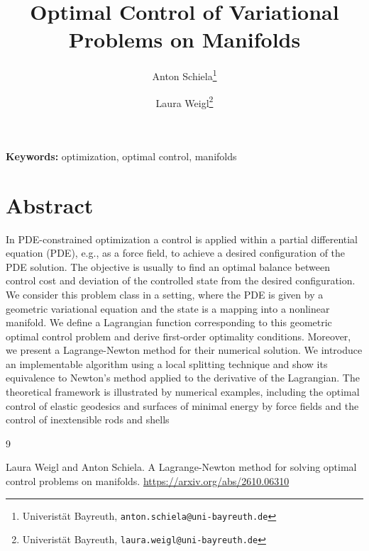 \documentclass[11pt]{article}
\title{\bfseries Optimal Control of Variational Problems on Manifolds}
\author{
Anton Schiela\thanks{Univeristät Bayreuth,
\texttt{anton.schiela@uni-bayreuth.de}}
\and
Laura Weigl\thanks{Univeristät Bayreuth,
\texttt{laura.weigl@uni-bayreuth.de}}
}
\date{}
\begin{document}
\maketitle

\vspace{-1em}

\noindent
\textbf{Keywords:}
optimization, optimal control, manifolds 

\vspace{0.5em}


\vspace{1em}

\section*{Abstract}

In PDE-constrained optimization a control is applied within a partial differential equation (PDE), e.g., as a force field, to achieve a desired configuration of the PDE solution. The objective is usually to find an optimal balance between control cost and deviation of the controlled state from the desired configuration.
We consider this problem class in a setting, where the PDE is given by a geometric variational equation and the state is a mapping into a nonlinear manifold. We define a Lagrangian function corresponding to this geometric optimal control problem and derive first-order optimality conditions. Moreover, we present a Lagrange-Newton method for their numerical solution. We introduce an implementable algorithm using a local splitting technique and show its equivalence to Newton's method applied to the derivative of the Lagrangian. The theoretical framework is illustrated by numerical examples, including the optimal control of elastic geodesics and surfaces of minimal energy by force fields and the control of inextensible rods and shells



\vspace{1em}

\begin{thebibliography}{9}


Laura Weigl and Anton Schiela.
\newblock A Lagrange-Newton method for solving optimal control problems on manifolds.
\newblock \url{https://arxiv.org/abs/2610.06310}


\end{thebibliography}
\end{document}
